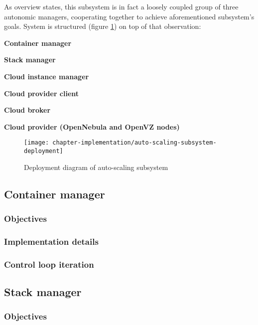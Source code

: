 As overview states, this subsystem is in fact a loosely coupled group of three autonomic managers, cooperating together to achieve aforementioned subsystem's goals. System is structured (figure \ref{fig:auto-scaling-subsystem-deployment}) on top of that observation:

\begin{asparaenum}
 \item[\textbf{Container manager}]
 \item[\textbf{Stack manager}]
 \item[\textbf{Cloud instance manager}]
 \item[\textbf{Cloud provider client}]
 \item[\textbf{Cloud broker}]
 \item[\textbf{Cloud provider (OpenNebula and OpenVZ nodes)}]
\end{asparaenum}


\begin{figure}[!ht]
  \begin{center}
    \texttt{[image: chapter-implementation/auto-scaling-subsystem-deployment]}
  \end{center}
  \caption{Deployment diagram of auto-scaling subsystem}
  \label{fig:auto-scaling-subsystem-deployment}
\end{figure}



\subsection{Container manager}

\subsubsection{Objectives}
\subsubsection{Implementation details}
\subsubsection{Control loop iteration}


\subsection{Stack manager}

\subsubsection{Objectives}
